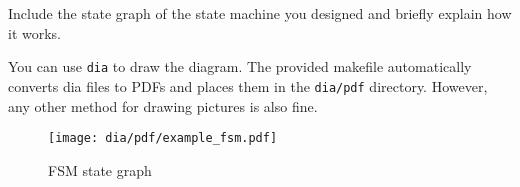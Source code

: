 \documentclass[10pt,a4paper,titlepage,oneside]{article}
\begin{document}
\begin{qa}{Include the state graph of the state machine you designed and briefly explain how it works.}

You can use \texttt{dia} to draw the diagram. The provided makefile automatically converts dia files to PDFs and places them in the \texttt{dia/pdf} directory.
However, any other method for drawing pictures is also fine. 

\begin{figure}[h!]
	\centering
	\texttt{[image: dia/pdf/example\_fsm.pdf]}
	\caption{FSM state graph}
\end{figure}

\end{qa}
\end{document}
